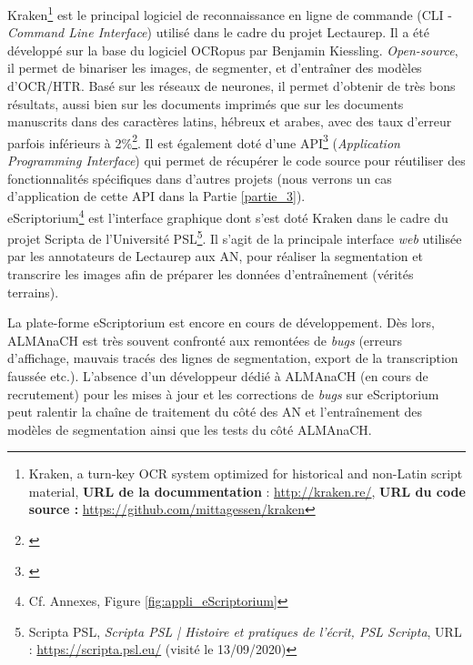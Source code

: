 \newpage
Kraken\footnote{Kraken, a turn-key OCR system optimized for historical and non-Latin script material, \textbf{URL de la docummentation} : \url{http://kraken.re/}, \textbf{URL du code source :} \url{https://github.com/mittagessen/kraken}} est le principal logiciel de reconnaissance en ligne de commande (CLI -\textit{Command Line Interface}) utilisé dans le cadre du projet Lectaurep. Il a été développé sur la base du logiciel OCRopus par Benjamin Kiessling. \textit{Open-source}, il permet de binariser les images, de segmenter, et d'entraîner des modèles d'OCR/HTR. Basé sur les réseaux de neurones, il permet d'obtenir de très bons résultats, aussi bien sur les documents imprimés que sur les documents manuscrits dans des caractères latins, hébreux et arabes, avec des taux d'erreur parfois inférieurs à 2\%\footnote{\cite{kiessling_important_nodate}}. Il est également doté d'une API\footnote{\cite{noauthor_kraken_nodate}} (\textit{Application Programming Interface}) qui permet de récupérer le code source pour réutiliser des fonctionnalités spécifiques dans d'autres projets (nous verrons un cas d'application de cette API dans la Partie \ref{partie_3}).\\

eScriptorium\footnote{Cf. Annexes, Figure \ref{fig:appli_eScriptorium}} est l'interface graphique dont s'est doté Kraken dans le cadre du projet Scripta de l'Université PSL\footnote{Scripta PSL, \textit{Scripta PSL | Histoire et pratiques de l’écrit, PSL Scripta}, URL : \url{https://scripta.psl.eu/} (visité le 13/09/2020)}. Il s'agit de la principale interface \textit{web} utilisée par les annotateurs de Lectaurep aux AN, pour réaliser la segmentation et transcrire les images afin de préparer les données d'entraînement (vérités terrains).

La plate-forme eScriptorium est encore en cours de développement. Dès lors, ALMAnaCH est très souvent confronté aux remontées de \textit{bugs} (erreurs d'affichage, mauvais tracés des lignes de segmentation, export de la transcription faussée etc.). L'absence d'un développeur dédié à ALMAnaCH (en cours de recrutement) pour les mises à jour et les corrections de \textit{bugs} sur eScriptorium peut ralentir la chaîne de traitement du côté des AN et l'entraînement des modèles de segmentation ainsi que les tests du côté ALMAnaCH. \\

